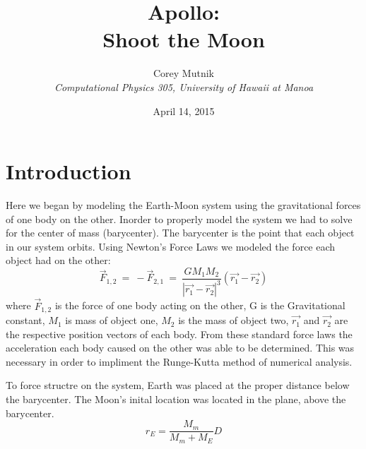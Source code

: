 \documentclass[11pt]{article}
\begin{document}
\pagestyle{myheadings}


\title{Apollo:\\
Shoot the Moon}


\author{Corey Mutnik \\
{\it Computational Physics 305, University of Hawaii at Manoa} }


\date{April 14, 2015}

\maketitle   





\section{Introduction}
Here we began by modeling the Earth-Moon system using the gravitational forces of one body on the other.  Inorder to properly 
model the system we had to solve for the center of mass (barycenter).  The barycenter is the point that each object in our system 
orbits.  Using Newton's Force Laws we modeled the force each object had on the other:
\begin{equation}
\label{fME}
\vec {F}_{1,2} ~=~ -\vec {F}_{2,1} ~=~ \frac{GM_{1}M_{2}}{| \vec {r_1} - \vec {r_2} |^3}(\vec {r_1} - \vec {r_2}) 
\end{equation}
where $\vec {F}_{1,2}$ is the force of one body acting on the other, G is the Gravitational constant, 
$M_{1}$ is mass of object one, 
$M_{2}$ is the mass of object two, $\vec {r_1}$ and $\vec {r_2}$ are the respective position vectors of each body.  
From these standard force laws the acceleration each body caused on the other was able to be determined.  This was necessary 
in order to impliment the Runge-Kutta method of numerical analysis.




To force structre on the system, Earth was placed at the proper distance below the barycenter.  The Moon's inital location was  
located in the plane, above the barycenter.
\begin{equation}
\label{rEb}
r_{E} = \frac {M_m}{M_{m}+M_{E}}D
\end{equation}
\end{document}
